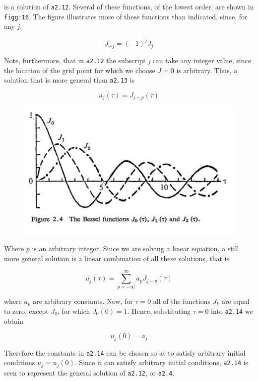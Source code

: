 is a solution of \texttt{a2.12}. Several of these functions, of the
lowest order, are shown in \texttt{figg:16}. The figure illustrates more
of these functions than indicated, since, for any \(j\),

\[J_{- j} = \left( - 1 \right)^{j}J_{j}\]

Note, furthermore, that in \texttt{a2.12} the subscript \emph{j} can
take any integer value, since the location of the grid point for which
we choose \(J = 0\) is arbitrary. Thus, a solution that is more general
than \texttt{a2.13} is

\[u_{j}\left( \tau \right) = J_{j - p}\left( \tau \right)\]

\begin{figure}
 \centering
 \includegraphics[keepaspectratio]{figs/NM/pic16.jpg}
 \caption{} \label{fig:}
\end{figure}

Where \(p\) is an arbitrary integer. Since we are solving a linear
equation, a still more general solution is a linear combination of all
these solutions, that is

 {\[u_{j}\left( \tau \right) = \sum_{p = - \infty}^{\infty}{a_{p}J_{j - p}}\left( \tau \right)\]}

where \(a_{p}\) are arbitrary constants. Now, for \(\tau = 0\) all of
the functions \(J_{k}\) are equal to zero, except \(J_{0}\), for which
\(J_{0}\left( 0 \right) = 1\). Hence, substituting \(\tau = 0\) into
\texttt{a2.14} we obtain

 {\[u_{j}\left( 0 \right) = a_{j}\]}

Therefore the constants in \texttt{a2.14} can be chosen so as to satisfy
arbitrary initial conditions \(u_{j} = u_{j}\left( 0 \right)\). Since it
can satisfy arbitrary initial conditions, \texttt{a2.14} is seen to
represent the general solution of \texttt{a2.12}, or \texttt{a2.4}.

